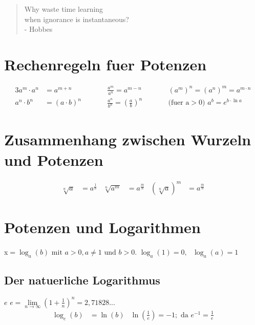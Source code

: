 \begin{quote}
Why waste time learning\\when ignorance is instantaneous?\\- Hobbes
\end{quote}

	\section{Rechenregeln fuer Potenzen}
			\begin{alignat*}{3}
				a^m \cdot a^n &= a^{m+n} &\quad\quad& \frac{a^m}{a^n} = a^{m-n} &\quad\quad& \left( a^m \right)^n = \left( a^n \right)^m = a^{m \cdot n} \\ 
				a^n \cdot b^n &= \left( a \cdot b \right)^n && \frac{a^n}{b^n} = \left( \frac{a}{b} \right)^n && \text{(fuer a} > \text{0) } a^b = e^{b \cdot \ln a}
			\end{alignat*}	
	\vspace{10mm}
	\section{Zusammenhang zwischen Wurzeln und Potenzen}					
			\begin{align*}
				\sqrt[n]{a} &= a^{\frac{1}{n}} & \sqrt[n]{a^m} &= a^{\frac{m}{n}} & \left(\sqrt[n]{a}\right)^m &= a^{ \frac{m}{n}}
			\end{align*}	
	\newpage
	\section{Potenzen und Logarithmen}
			x\(=\log_a \left(b\right) \text{ mit } a > 0, a \neq 1 \text{ und } b > 0 \text{.}\)
			\newline
			\(\log_a \left(1\right) = 0, \text{ } \log_a \left( a \right) = 1\)
	\vspace{10mm}
	\subsection*{Der natuerliche Logarithmus}
			\begin{flushleft}
			 \(e\)  \(e = \lim\limits_{n\to\infty} {\left(1+\frac{1}{n}\right)^n} = 2,71828...\)
			\begin{align*}
				\log_e \left(b\right) &= \ln \left(b\right) & \ln \left( \frac{1}{e} \right) = -1 ; \text{ da } e^{-1} = \frac{1}{e}
			\end{align*}
			
			\end{flushleft}	
	\vspace{10mm}
